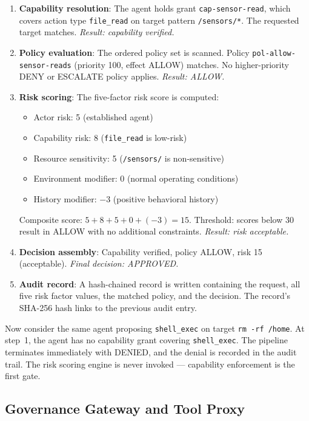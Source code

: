 \documentclass[journal]{IEEEtran}
\begin{document}
\begin{enumerate}
\item \textbf{Capability resolution}: The agent holds grant \texttt{cap-sensor-read}, which covers action type \texttt{file\_read} on target pattern \texttt{/sensors/*}. The requested target matches. \textit{Result: capability verified.}

\item \textbf{Policy evaluation}: The ordered policy set is scanned. Policy \texttt{pol-allow-sensor-reads} (priority 100, effect ALLOW) matches. No higher-priority DENY or ESCALATE policy applies. \textit{Result: ALLOW.}

\item \textbf{Risk scoring}: The five-factor risk score is computed:
\begin{itemize}
\item Actor risk: 5 (established agent)
\item Capability risk: 8 (\texttt{file\_read} is low-risk)
\item Resource sensitivity: 5 (\texttt{/sensors/} is non-sensitive)
\item Environment modifier: 0 (normal operating conditions)
\item History modifier: $-$3 (positive behavioral history)
\end{itemize}
Composite score: $5 + 8 + 5 + 0 + (-3) = 15$. Threshold: scores below 30 result in ALLOW with no additional constraints. \textit{Result: risk acceptable.}

\item \textbf{Decision assembly}: Capability verified, policy ALLOW, risk 15 (acceptable). \textit{Final decision: APPROVED.}

\item \textbf{Audit record}: A hash-chained record is written containing the request, all five risk factor values, the matched policy, and the decision. The record's SHA-256 hash links to the previous audit entry.
\end{enumerate}

Now consider the same agent proposing \texttt{shell\_exec} on target \texttt{rm -rf /home}. At step~1, the agent has no capability grant covering \texttt{shell\_exec}. The pipeline terminates immediately with DENIED, and the denial is recorded in the audit trail. The risk scoring engine is never invoked --- capability enforcement is the first gate.

\subsection{Governance Gateway and Tool Proxy}
\end{document}
